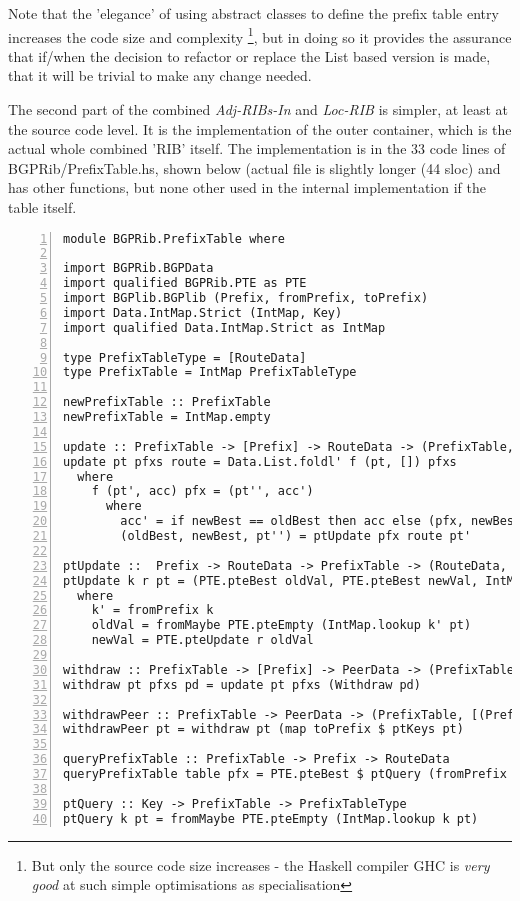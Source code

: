 \bigskip

Note that the 'elegance' of using abstract classes to define the prefix table entry increases  the code size and complexity \footnote{But only the source code size increases - the Haskell compiler GHC is \textit{very good} at such simple optimisations as specialisation}, but in doing so it provides the assurance that if/when the decision to refactor or replace the List based version is made, that it will be trivial to make any change needed. 
\bigskip

The second part of the  combined \textit{Adj-RIBs-In} and \textit{Loc-RIB} is simpler, at least at the source code level.  It is the implementation of the outer container, which is the actual whole combined 'RIB' itself.   The implementation is in the 33 code lines of BGPRib/PrefixTable.hs, shown below (actual file is slightly longer (44 sloc) and has other functions, but none other used in the internal implementation if the table itself.

\begin{lstlisting}[numbers = left, title=BGPRib/PrefixTable.hs (some functions removed for clarity)]
module BGPRib.PrefixTable where

import BGPRib.BGPData
import qualified BGPRib.PTE as PTE
import BGPlib.BGPlib (Prefix, fromPrefix, toPrefix)
import Data.IntMap.Strict (IntMap, Key)
import qualified Data.IntMap.Strict as IntMap

type PrefixTableType = [RouteData]
type PrefixTable = IntMap PrefixTableType

newPrefixTable :: PrefixTable
newPrefixTable = IntMap.empty

update :: PrefixTable -> [Prefix] -> RouteData -> (PrefixTable, [(Prefix, RouteData)])
update pt pfxs route = Data.List.foldl' f (pt, []) pfxs
  where
    f (pt', acc) pfx = (pt'', acc')
      where
        acc' = if newBest == oldBest then acc else (pfx, newBest) : acc
        (oldBest, newBest, pt'') = ptUpdate pfx route pt'

ptUpdate ::  Prefix -> RouteData -> PrefixTable -> (RouteData, RouteData, PrefixTable)
ptUpdate k r pt = (PTE.pteBest oldVal, PTE.pteBest newVal, IntMap.insert k' newVal pt)
  where
    k' = fromPrefix k
    oldVal = fromMaybe PTE.pteEmpty (IntMap.lookup k' pt)
    newVal = PTE.pteUpdate r oldVal

withdraw :: PrefixTable -> [Prefix] -> PeerData -> (PrefixTable, [(Prefix, RouteData)])
withdraw pt pfxs pd = update pt pfxs (Withdraw pd)

withdrawPeer :: PrefixTable -> PeerData -> (PrefixTable, [(Prefix, RouteData)])
withdrawPeer pt = withdraw pt (map toPrefix $ ptKeys pt)

queryPrefixTable :: PrefixTable -> Prefix -> RouteData
queryPrefixTable table pfx = PTE.pteBest $ ptQuery (fromPrefix pfx) table

ptQuery :: Key -> PrefixTable -> PrefixTableType
ptQuery k pt = fromMaybe PTE.pteEmpty (IntMap.lookup k pt)
\end{lstlisting}

